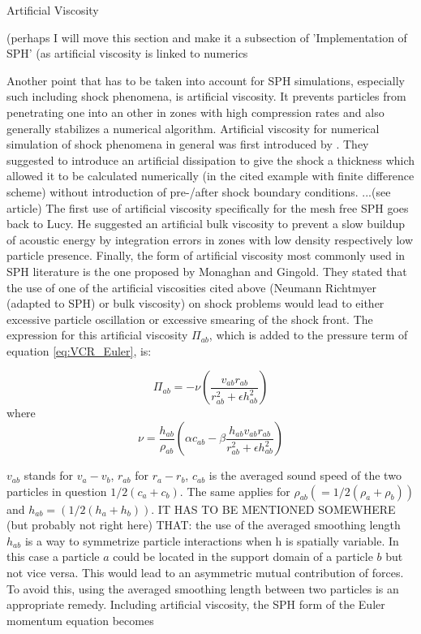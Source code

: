 \documentclass{report}
\begin{document}
Artificial Viscosity

(perhaps I will move this section and make it a subsection of 'Implementation of SPH' (as artificial viscosity is linked to numerics

Another point that has to be taken into account for SPH simulations, especially
such including shock phenomena, is artificial viscosity\cite{Monaghan2005}. It
prevents particles from penetrating one into an other in zones with high
compression rates and also generally stabilizes a numerical
algorithm.
Artificial viscosity for numerical simulation of shock phenomena
in general was first introduced by \cite{vonNeumann1950}. They suggested to
introduce an artificial dissipation to give the shock a thickness which
allowed it to be calculated numerically (in the cited example with finite difference
scheme) without introduction of pre-/after shock boundary conditions.    ...(see article)
The first use of artificial viscosity specifically for the mesh free SPH goes
back to Lucy\cite{Lucy1977}. He suggested an artificial bulk viscosity to
prevent a slow buildup of acoustic energy by integration errors in zones with
low density respectively low particle presence. 
Finally, the form of artificial viscosity most commonly used in SPH
literature\cite{Liu2003} is the one proposed by Monaghan and
Gingold\cite{Monaghan1983}. They stated that the use of one of the artificial
viscosities cited above (Neumann Richtmyer (adapted to SPH) or bulk
viscosity) on shock problems would lead to either excessive particle
oscillation or excessive smearing of the shock front. The expression for this
artificial viscosity $\Pi_{ab}$, which is added to the pressure term of
equation \ref{eq:VCR_Euler}, is:

\begin{equation}
\label{eq:MonArtVis}
\Pi _{\mathit{ab}}=-\nu
\left(\frac{v_{\mathit{ab}}r_{\mathit{ab}}}{r_{\mathit{ab}}^{2}+\epsilon
h_{\mathit{ab}}^{2}}\right)
\end{equation}
where 
\begin{equation}
\label{eq:FactArtVis}
\nu =\frac{h_{\mathit{ab}}}{\rho _{\mathit{ab}}}\left(\alpha
c_{\mathit{ab}}-\beta
\frac{h_{\mathit{ab}}v_{\mathit{ab}}r_{\mathit{ab}}}{r_{\mathit{ab}}^{2}+\epsilon
h_{\mathit{ab}}^{2}}\right)
\end{equation}

$v_{ab}$ stands for $v_a-v_b$, $r_{ab}$ for $r_a-r_b$, $c_{ab}$ is the
averaged sound speed of the two particles in question $1/2(c_a+c_b)$. The same
applies for $\rho_{ab}(=1/2(\rho_a+\rho_b))$ and $h_{ab}=(1/2(h_a+h_b))$. IT
HAS TO BE MENTIONED SOMEWHERE (but probably not right here) THAT: the use of
the averaged smoothing length $h_{ab}$ is a way to symmetrize particle
interactions when h is spatially variable. In this case a particle $a$ could be
located in the support domain of a particle $b$ but not vice versa. This would
lead to an asymmetric mutual contribution of forces. To avoid this, using the
averaged smoothing length between two particles is an appropriate remedy\cite{Liu2003}.
Including artificial viscosity, the SPH form of the Euler momentum equation becomes\cite{Monaghan2005}
\end{document}
